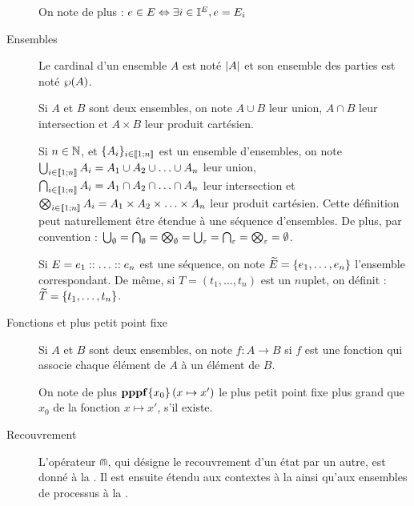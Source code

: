 \begin{description}
    On note de plus : $e \in E \Leftrightarrow \exists i \in \mathbb{I}^{E}, e = E_i$
  
  \item[Ensembles]
    Le cardinal d'un ensemble $A$ est noté $|A|$
    et son ensemble des parties est noté $\wp(A)$.
    
    Si $A$ et $B$ sont deux ensembles, on note
    $A \cup B$ leur union, $A \cap B$ leur intersection et $A \times B$ leur produit cartésien.
    
    Si $n \in \mathbb{N}$, et $\{ A_i \}_{i \in \mathopen{\llbracket}1\mathclose{};n\mathclose{\rrbracket}}$ est un ensemble d'ensembles, on note
    $\bigcup_{i \in \mathopen{\llbracket}1\mathclose{};n\mathclose{\rrbracket}} A_i = A_1 \cup A_2 \cup \ldots \cup A_n$ leur union,
    $\bigcap_{i \in \mathopen{\llbracket}1\mathclose{};n\mathclose{\rrbracket}} A_i = A_1 \cap A_2 \cap \ldots \cap A_n$ leur intersection et
    $\bigotimes_{i \in \mathopen{\llbracket}1\mathclose{};n\mathclose{\rrbracket}} A_i = A_1 \times A_2 \times \ldots \times A_n$
    leur produit cartésien.
    Cette définition peut naturellement être étendue à une séquence d'ensembles.
    De plus, par convention :
    $\bigcup_{\emptyset} = \bigcap_{\emptyset} = \bigotimes_{\emptyset} =
      \bigcup_{\varepsilon} = \bigcap_{\varepsilon} = \bigotimes_{\varepsilon} = \emptyset$.
    
    Si $E = e_1 :: \ldots :: e_n$ est une séquence,
    on note $\widetilde{E} = \{ e_1, \ldots, e_n \}$ l'ensemble correspondant.
    De même, si $T = (t_1, \ldots, t_n)$ est un $n$\nbd uplet,
    on définit : $\widetilde{T} = \{ t_1, \ldots, t_n \}$.
  
  \item[Fonctions et plus petit point fixe]
    Si $A$ et $B$ sont deux ensembles,
    on note $f : A \rightarrow B$
    si $f$ est une fonction qui associe chaque élément de $A$ à un élément de $B$.
    
    On note de plus $\mathbf{pppf}\{x_0\}\left(x\mapsto x'\right)$ le plus petit point fixe plus grand que $x_0$
    de la fonction $x \mapsto x'$, s'il existe.
  
  \item[Recouvrement]
    L'opérateur $\Cap$, qui désigne le recouvrement d'un état par un autre,
    est donné à la .
    Il est ensuite étendu
    aux contextes à la 
    ainsi qu'aux ensembles de processus à la .
\end{description}

